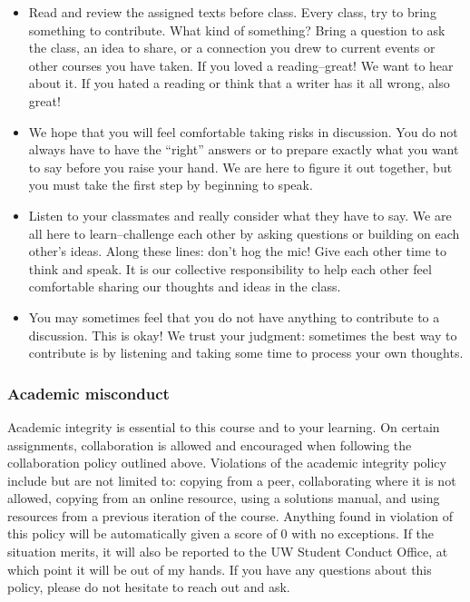 \documentclass[
]{article}
\providecommand{\tightlist}{%
  \setlength{\itemsep}{0pt}\setlength{\parskip}{0pt}}
\begin{document}
\begin{itemize}
\tightlist
\item
  Read and review the assigned texts before class. Every class, try to
  bring something to contribute. What kind of something? Bring a
  question to ask the class, an idea to share, or a connection you drew
  to current events or other courses you have taken. If you loved a
  reading--great! We want to hear about it. If you hated a reading or
  think that a writer has it all wrong, also great!
\item
  We hope that you will feel comfortable taking risks in discussion. You
  do not always have to have the ``right'' answers or to prepare exactly
  what you want to say before you raise your hand. We are here to figure
  it out together, but you must take the first step by beginning to
  speak.
\item
  Listen to your classmates and really consider what they have to say.
  We are all here to learn--challenge each other by asking questions or
  building on each other's ideas. Along these lines: don't hog the mic!
  Give each other time to think and speak. It is our collective
  responsibility to help each other feel comfortable sharing our
  thoughts and ideas in the class.
\item
  You may sometimes feel that you do not have anything to contribute to
  a discussion. This is okay! We trust your judgment: sometimes the best
  way to contribute is by listening and taking some time to process your
  own thoughts.
\end{itemize}

\hypertarget{academic-misconduct}{%
\subsubsection{Academic misconduct}\label{academic-misconduct}}

Academic integrity is essential to this course and to your learning. On
certain assignments, collaboration is allowed and encouraged when
following the collaboration policy outlined above. Violations of the
academic integrity policy include but are not limited to: copying from a
peer, collaborating where it is not allowed, copying from an online
resource, using a solutions manual, and using resources from a previous
iteration of the course. Anything found in violation of this policy will
be automatically given a score of 0 with no exceptions. If the situation
merits, it will also be reported to the UW Student Conduct Office, at
which point it will be out of my hands. If you have any questions about
this policy, please do not hesitate to reach out and ask.
\end{document}
